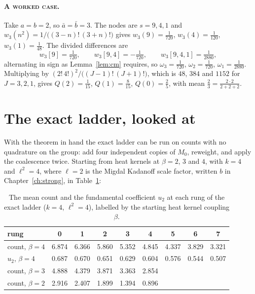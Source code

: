 \paragraph{\normalfont\scshape A worked case.} Take $a=b=2$, so $\bar a=\bar b=3$. The nodes are $s=9,4,1$ and $w_3(n^2)=1/\big((3-n)!\,(3+n)!\big)$ gives $w_3(9)=\frac1{720}$, $w_3(4)=\frac1{120}$, $w_3(1)=\frac1{48}$. The divided differences are
\[
w_3[9]=\tfrac1{720},\qquad w_3[9,4]=-\tfrac1{720},\qquad w_3[9,4,1]=\tfrac1{2880},
\]
alternating in sign as Lemma~\ref{lem:cm} requires, so $\omega_3=\frac1{720}$, $\omega_2=\frac1{720}$, $\omega_1=\frac1{2880}$. Multiplying by $(2!\,4!)^2/\big((J-1)!\,(J+1)!\big)$, which is $48$, $384$ and $1152$ for $J=3,2,1$, gives $Q(2)=\frac1{15}$, $Q(1)=\frac8{15}$, $Q(0)=\frac25$, with mean $\frac23=\frac{2\cdot2}{2+2+2}$.

\section{The exact ladder, looked at}

With the theorem in hand the exact ladder can be run on counts with no quadrature on the group: add four independent copies of $M_0$, reweight, and apply the coalescence twice. Starting from heat kernels at $\beta=2$, $3$ and $4$, with $k=4$ and $\ell^2=4$, where $\ell=2$ is the Migdal Kadanoff scale factor, written $b$ in Chapter~\ref{ch:strong}, in Table~\ref{tab:rungs}:

\begin{table}[t]
\centering\footnotesize
\begin{tabular}{lcccccccc}
\toprule
rung & 0 & 1 & 2 & 3 & 4 & 5 & 6 & 7 \\ \midrule
count, $\beta=4$ & 6.874 & 6.366 & 5.860 & 5.352 & 4.845 & 4.337 & 3.829 & 3.321 \\
$u_2$, $\beta=4$ & 0.687 & 0.670 & 0.651 & 0.629 & 0.604 & 0.576 & 0.544 & 0.507 \\
count, $\beta=3$ & 4.888 & 4.379 & 3.871 & 3.363 & 2.854 & & & \\
count, $\beta=2$ & 2.916 & 2.407 & 1.899 & 1.394 & 0.896 & & & \\
\bottomrule
\end{tabular}
\caption[The exact ladder on counts, by rung]{The mean count and the fundamental coefficient $u_2$ at each rung of the exact ladder ($k=4$, $\ell^2=4$), labelled by the starting heat kernel coupling $\beta$.}
\label{tab:rungs}
\end{table}

